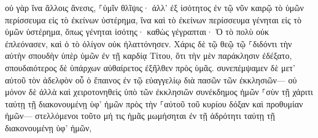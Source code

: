 \documentclass{openreader}
\begin{document}
οὐ γὰρ ἵνα ἄλλοις ἄνεσις, ⸀ὑμῖν θλῖψις· ἀλλ’ ἐξ ἰσότητος 
ἐν τῷ νῦν καιρῷ τὸ ὑμῶν περίσσευμα εἰς τὸ ἐκείνων ὑστέρημα, ἵνα καὶ τὸ ἐκείνων περίσσευμα γένηται εἰς τὸ ὑμῶν ὑστέρημα, ὅπως γένηται ἰσότης· 
καθὼς γέγραπται· Ὁ τὸ πολὺ οὐκ ἐπλεόνασεν, καὶ ὁ τὸ ὀλίγον οὐκ ἠλαττόνησεν. 
Χάρις δὲ τῷ θεῷ τῷ ⸀διδόντι τὴν αὐτὴν σπουδὴν ὑπὲρ ὑμῶν ἐν τῇ καρδίᾳ Τίτου, 
ὅτι τὴν μὲν παράκλησιν ἐδέξατο, σπουδαιότερος δὲ ὑπάρχων αὐθαίρετος ἐξῆλθεν πρὸς ὑμᾶς. 
συνεπέμψαμεν δὲ μετ’ αὐτοῦ τὸν ἀδελφὸν οὗ ὁ ἔπαινος ἐν τῷ εὐαγγελίῳ διὰ πασῶν τῶν ἐκκλησιῶν— 
οὐ μόνον δὲ ἀλλὰ καὶ χειροτονηθεὶς ὑπὸ τῶν ἐκκλησιῶν συνέκδημος ἡμῶν ⸀σὺν τῇ χάριτι ταύτῃ τῇ διακονουμένῃ ὑφ’ ἡμῶν πρὸς τὴν ⸀αὐτοῦ τοῦ κυρίου δόξαν καὶ προθυμίαν ἡμῶν— 
στελλόμενοι τοῦτο μή τις ἡμᾶς μωμήσηται ἐν τῇ ἁδρότητι ταύτῃ τῇ διακονουμένῃ ὑφ’ ἡμῶν, 
\end{document}
